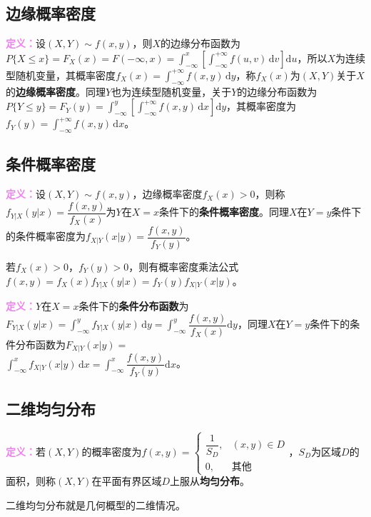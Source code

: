 \documentclass[UTF8, 12pt]{ctexart}
\begin{document}
\subsection{边缘概率密度}

\textcolor{violet}{\textbf{定义：}}设$(X,Y)\sim f(x,y)$，则$X$的边缘分布函数为$P\{X\leqslant x\}=F_X(x)=F(-\infty,x)=\int_{-\infty}^x\left[\int_{-\infty}^{+\infty}f(u,v)\,\textrm{d}v\right]\textrm{d}u$，所以$X$为连续型随机变量，其概率密度$f_X(x)=\int_{-\infty}^{+\infty}f(x,y)\,\textrm{d}y$，称$f_X(x)$为$(X,Y)$关于$X$的\textbf{边缘概率密度}。同理$Y$也为连续型随机变量，关于$Y$的边缘分布函数为$P\{Y\leqslant y\}=F_Y(y)=\int_{-\infty}^y[\int_{-\infty}^{+\infty}f(x,y)\,\textrm{d}x]\textrm{d}y$，其概率密度为$f_Y(y)=\int_{-\infty}^{+\infty}f(x,y)\,\textrm{d}x$。

\subsection{条件概率密度}

\textcolor{violet}{\textbf{定义：}}设$(X,Y)\sim f(x,y)$，边缘概率密度$f_X(x)>0$，则称$f_{Y|X}(y|x)=\dfrac{f(x,y)}{f_X(x)}$为$Y$在$X=x$条件下的\textbf{条件概率密度}。同理$X$在$Y=y$条件下的条件概率密度为$f_{X|Y}(x|y)=\dfrac{f(x,y)}{f_Y(y)}$。

若$f_X(x)>0$，$f_Y(y)>0$，则有概率密度乘法公式$f(x,y)=f_X(x)f_{Y|X}(y|x)=f_Y(y)f_{X|Y}(x|y)$。

\textcolor{violet}{\textbf{定义：}}$Y$在$X=x$条件下的\textbf{条件分布函数}为$F_{Y|X}(y|x)=\int_{-\infty}^yf_{Y|X}(y|x)\,\textrm{d}y=\displaystyle{\int_{-\infty}^y\dfrac{f(x,y)}{f_X(x)}\textrm{d}y}$，同理$X$在$Y=y$条件下的条件分布函数为$F_{X|Y}(x|y)=$\\$\int_{-\infty}^xf_{X|Y}(x|y)\,\textrm{d}x=\displaystyle{\int_{-\infty}^x\dfrac{f(x,y)}{f_Y(y)}}\textrm{d}x$。

\subsection{二维均匀分布}

\textcolor{violet}{\textbf{定义：}}若$(X,Y)$的概率密度为$f(x,y)=\left\{\begin{array}{ll}
    \dfrac{1}{S_D}, & (x,y)\in D \\
    0, & \text{其他}
\end{array}\right.$，$S_D$为区域$D$的面积，则称$(X,Y)$在平面有界区域$D$上服从\textbf{均匀分布}。

二维均匀分布就是几何概型的二维情况。
\end{document}

